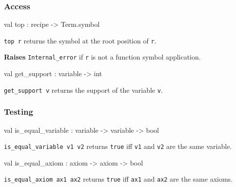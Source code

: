 \subsubsection{Access}




\label{val:Recipe.top}\begin{ocamldoccode}
val top : recipe -> Term.symbol
\end{ocamldoccode}
\begin{ocamldocdescription}
{\tt{top r}} returns the symbol at the root position of {\tt{r}}.

{\bf Raises} {\tt{Internal\_error}} if {\tt{r}} is not a function symbol application.


\end{ocamldocdescription}




\label{val:Recipe.get-underscoresupport}\begin{ocamldoccode}
val get_support : variable -> int
\end{ocamldoccode}
\begin{ocamldocdescription}
{\tt{get\_support v}} returns the support of the variable {\tt{v}}.


\end{ocamldocdescription}




\subsubsection{Testing}




\label{val:Recipe.is-underscoreequal-underscorevariable}\begin{ocamldoccode}
val is_equal_variable : variable -> variable -> bool
\end{ocamldoccode}
\begin{ocamldocdescription}
{\tt{is\_equal\_variable v1 v2}} returns {\tt{true}} iff {\tt{v1}} and {\tt{v2}} are the same variable.


\end{ocamldocdescription}




\label{val:Recipe.is-underscoreequal-underscoreaxiom}\begin{ocamldoccode}
val is_equal_axiom : axiom -> axiom -> bool
\end{ocamldoccode}
\begin{ocamldocdescription}
{\tt{is\_equal\_axiom ax1 ax2}} returns {\tt{true}} iff {\tt{ax1}} and {\tt{ax2}} are the same axioms.


\end{ocamldocdescription}




